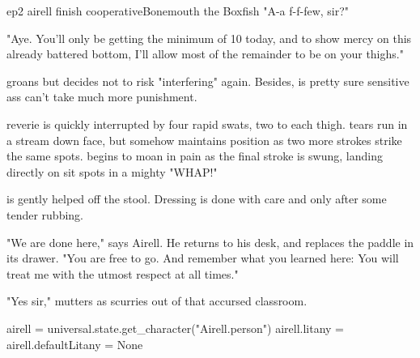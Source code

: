 \documentclass{book}
\begin{document}
\begin{childnode}{ep2 airell finish cooperative}{Bonemouth the Boxfish}
"A-a f-f-few, sir?" 

"Aye. You'll only be getting the minimum of 10 today, and to show mercy on this already battered bottom, I'll allow most of the remainder to be on your thighs."

\name{} groans but decides not to risk "interfering" again. Besides, \heshe{} is pretty sure \hisher{} sensitive ass can't take much more punishment.

\HisHer{} reverie is quickly interrupted by four rapid swats, two to each thigh. \names{} tears run in a stream down \hisher{} face, but \heshe{} somehow maintains \hisher{} position as two more 
strokes strike the same spots. \HeShe{} begins to moan in pain as the final stroke is swung, landing directly on \hisher{} sit spots in a mighty "WHAP!"

\name{} is gently helped off the stool. Dressing is done with care and only after some tender rubbing. 

"We are done here," says Airell. He returns to his desk, and replaces the paddle in its drawer. "You are free to go. And remember what you learned here: You will treat me with the utmost respect 
at all times."

"Yes sir," mutters \name{} as \heshe{} scurries out of that accursed classroom.


\begin{code}

    airell = universal.state.get_character("Airell.person")
    airell.litany = airell.defaultLitany = None

\end{code}


\end{childnode}
\end{document}

